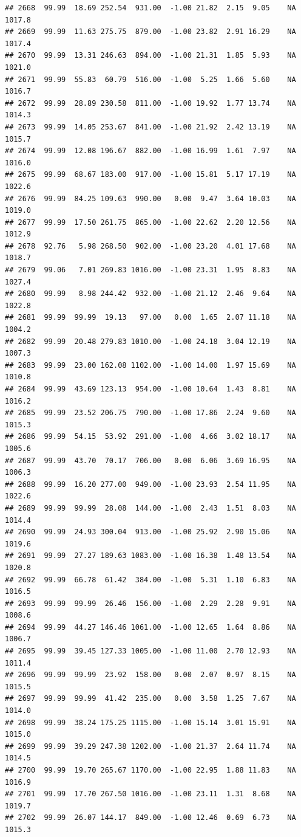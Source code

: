 \documentclass{article}\usepackage{graphicx, color}
\makeatletter
\newenvironment{kframe}{%
 \def\at@end@of@kframe{}%
 \ifinner\ifhmode%
  \def\at@end@of@kframe{\end{minipage}}%
  \begin{minipage}{\columnwidth}%
 \fi\fi%
 \def\FrameCommand##1{\hskip\@totalleftmargin \hskip-\fboxsep
 \colorbox{shadecolor}{##1}\hskip-\fboxsep
     \hskip-\linewidth \hskip-\@totalleftmargin \hskip\columnwidth}%
 \MakeFramed {\advance\hsize-\width
   \@totalleftmargin\z@ \linewidth\hsize
   \@setminipage}}%
 {\par\unskip\endMakeFramed%
 \at@end@of@kframe}
\newenvironment{knitrout}{}{} %
\makeatother
\begin{document}
\begin{knitrout}
\begin{kframe}
\begin{verbatim}
## 2668  99.99  18.69 252.54  931.00  -1.00 21.82  2.15  9.05    NA 1017.8
## 2669  99.99  11.63 275.75  879.00  -1.00 23.82  2.91 16.29    NA 1017.4
## 2670  99.99  13.31 246.63  894.00  -1.00 21.31  1.85  5.93    NA 1021.0
## 2671  99.99  55.83  60.79  516.00  -1.00  5.25  1.66  5.60    NA 1016.7
## 2672  99.99  28.89 230.58  811.00  -1.00 19.92  1.77 13.74    NA 1014.3
## 2673  99.99  14.05 253.67  841.00  -1.00 21.92  2.42 13.19    NA 1015.7
## 2674  99.99  12.08 196.67  882.00  -1.00 16.99  1.61  7.97    NA 1016.0
## 2675  99.99  68.67 183.00  917.00  -1.00 15.81  5.17 17.19    NA 1022.6
## 2676  99.99  84.25 109.63  990.00   0.00  9.47  3.64 10.03    NA 1019.0
## 2677  99.99  17.50 261.75  865.00  -1.00 22.62  2.20 12.56    NA 1012.9
## 2678  92.76   5.98 268.50  902.00  -1.00 23.20  4.01 17.68    NA 1018.7
## 2679  99.06   7.01 269.83 1016.00  -1.00 23.31  1.95  8.83    NA 1027.4
## 2680  99.99   8.98 244.42  932.00  -1.00 21.12  2.46  9.64    NA 1022.8
## 2681  99.99  99.99  19.13   97.00   0.00  1.65  2.07 11.18    NA 1004.2
## 2682  99.99  20.48 279.83 1010.00  -1.00 24.18  3.04 12.19    NA 1007.3
## 2683  99.99  23.00 162.08 1102.00  -1.00 14.00  1.97 15.69    NA 1010.8
## 2684  99.99  43.69 123.13  954.00  -1.00 10.64  1.43  8.81    NA 1016.2
## 2685  99.99  23.52 206.75  790.00  -1.00 17.86  2.24  9.60    NA 1015.3
## 2686  99.99  54.15  53.92  291.00  -1.00  4.66  3.02 18.17    NA 1005.6
## 2687  99.99  43.70  70.17  706.00   0.00  6.06  3.69 16.95    NA 1006.3
## 2688  99.99  16.20 277.00  949.00  -1.00 23.93  2.54 11.95    NA 1022.6
## 2689  99.99  99.99  28.08  144.00  -1.00  2.43  1.51  8.03    NA 1014.4
## 2690  99.99  24.93 300.04  913.00  -1.00 25.92  2.90 15.06    NA 1019.6
## 2691  99.99  27.27 189.63 1083.00  -1.00 16.38  1.48 13.54    NA 1020.8
## 2692  99.99  66.78  61.42  384.00  -1.00  5.31  1.10  6.83    NA 1016.5
## 2693  99.99  99.99  26.46  156.00  -1.00  2.29  2.28  9.91    NA 1008.6
## 2694  99.99  44.27 146.46 1061.00  -1.00 12.65  1.64  8.86    NA 1006.7
## 2695  99.99  39.45 127.33 1005.00  -1.00 11.00  2.70 12.93    NA 1011.4
## 2696  99.99  99.99  23.92  158.00   0.00  2.07  0.97  8.15    NA 1015.5
## 2697  99.99  99.99  41.42  235.00   0.00  3.58  1.25  7.67    NA 1014.0
## 2698  99.99  38.24 175.25 1115.00  -1.00 15.14  3.01 15.91    NA 1015.0
## 2699  99.99  39.29 247.38 1202.00  -1.00 21.37  2.64 11.74    NA 1014.5
## 2700  99.99  19.70 265.67 1170.00  -1.00 22.95  1.88 11.83    NA 1016.9
## 2701  99.99  17.70 267.50 1016.00  -1.00 23.11  1.31  8.68    NA 1019.7
## 2702  99.99  26.07 144.17  849.00  -1.00 12.46  0.69  6.73    NA 1015.3

\end{verbatim}
\end{kframe}
\end{knitrout}
\end{document}

